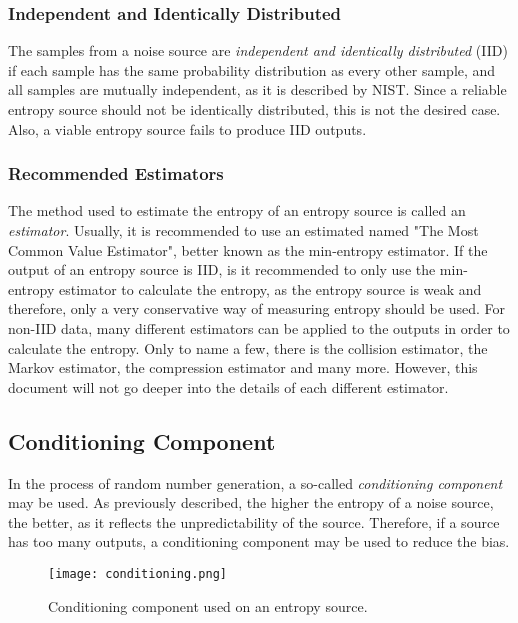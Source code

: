 \subsubsection{Independent and Identically Distributed}
The samples from a noise source are \emph{independent and identically distributed} (IID) if each sample
has the same probability distribution as every other sample, and all samples are mutually
independent, as it is described by NIST\cite{randomness:sources1}.
Since a reliable entropy source should not be identically distributed, this is not the desired case. Also, a viable entropy source fails to produce IID outputs.

\subsubsection{Recommended Estimators}
The method used to estimate the entropy of an entropy source is called an \emph{estimator}. Usually, it is recommended to use an estimated named "The Most Common Value Estimator", better known as the min-entropy estimator.
\newline
If the output of an entropy source is IID, is it recommended to only use the min-entropy estimator to calculate the entropy, as the entropy source is weak and therefore, only a very conservative way of measuring entropy should be used.
\emptyline
For non-IID data, many different estimators can be applied to the outputs in order to calculate the entropy. Only to name a few, there is the collision estimator, the Markov estimator, the compression estimator and many more.
However, this document will not go deeper into the details of each different estimator.


\subsection{Conditioning Component}
\label{conditioning}
In the process of random number generation, a so-called \emph{conditioning component} may be used.
As previously described, the higher the entropy of a noise source, the better, as it reflects the unpredictability of the source.
Therefore, if a source has too many outputs, a conditioning component may be used to reduce the bias\cite{randomness:generation1}.
\begin{figure}[H]
    \centering
    \texttt{[image: conditioning.png]}
    \caption{Conditioning component used on an entropy source\cite{randomness:sources1}.}
\end{figure}

